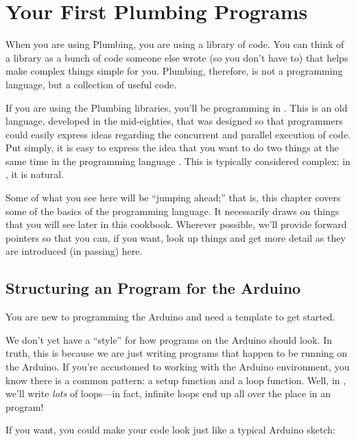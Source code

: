 \chapter{Your First Plumbing Programs\label{ch1}}
When you are using Plumbing, you are using a library of code. You can think of a library as a bunch of code someone else wrote (so you don't have to) that helps make complex things simple for you. Plumbing, therefore, is not a programming language, but a collection of useful code.

If you are using the Plumbing libraries, you'll be programming in \occam. This is an old language, developed in the mid-eighties, that was designed so that programmers could easily express ideas regarding the concurrent and parallel execution of code. Put simply, it is easy to express the idea that you want to do two things at the same time in the programming language \occam. This is typically considered complex; in \occam, it is natural.

Some of what you see here will be ``jumping ahead;'' that is, this chapter covers some of the basics of the \occam programming language. It necessarily draws on things that you will see later in this cookbook. Wherever possible, we'll provide forward pointers so that you can, if you want, look up things and get more detail as they are introduced (in passing) here. 

% 
\section{Structuring an \occam Program for the Arduino\label{structuring-for-arduino}}

\problem
You are new to programming the Arduino and need a template to get started.

\solution
We don't yet have a ``style'' for how \occam programs on the Arduino should look. In truth, this is because we are just writing \occam programs that happen to be running on the Arduino. If you're accustomed to working with the Arduino environment, you know there is a common pattern: a {\code setup} function and a {\code loop} function. Well, in \occam, we'll write \emph{lots} of loops---in fact, infinite loops end up all over the place in an \occam program!

If you want, you could make your code look just like a typical Arduino sketch:

